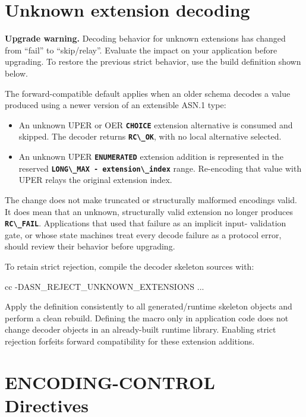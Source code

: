 \documentclass[english,oneside,12pt]{book}
\newcommand{\code}[1]{\texttt{\textbf{\lstinline{#1}}}}
\begin{document}
\section{\label{sec:Unknown-Extension-Decoding}Unknown extension decoding}

\textbf{Upgrade warning.} Decoding behavior for unknown extensions has changed
from ``fail'' to ``skip/relay''. Evaluate the impact on your application before
upgrading. To restore the previous strict behavior, use the build definition
shown below.

The forward-compatible default applies when an older schema decodes a value
produced using a newer version of an extensible ASN.1 type:

\begin{itemize}
\item An unknown UPER or OER \code{CHOICE} extension alternative is consumed
and skipped. The decoder returns \code{RC\_OK}, with no local alternative
selected.
\item An unknown UPER \code{ENUMERATED} extension addition is represented in
the reserved \code{LONG\_MAX - extension\_index} range. Re-encoding that value
with UPER relays the original extension index.
\end{itemize}

The change does not make truncated or structurally malformed encodings valid.
It does mean that an unknown, structurally valid extension no longer produces
\code{RC\_FAIL}. Applications that used that failure as an implicit input-
validation gate, or whose state machines treat every decode failure as a
protocol error, should review their behavior before upgrading.

To retain strict rejection, compile the decoder skeleton sources with:

\begin{bash}
cc -DASN_REJECT_UNKNOWN_EXTENSIONS ...
\end{bash}

Apply the definition consistently to all generated/runtime skeleton objects and
perform a clean rebuild. Defining the macro only in application code does not
change decoder objects in an already-built runtime library. Enabling strict
rejection forfeits forward compatibility for these extension additions.

\section{\label{sec:ENCODING-CONTROL}ENCODING-CONTROL Directives}
\end{document}
